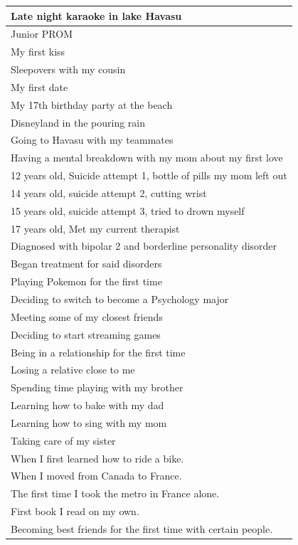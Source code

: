 \documentclass[
  .7em,
  letterpaper,
  DIV=11,
  numbers=noendperiod]{scrartcl}
\begin{document}
\begin{table}
\begin{tabular}{l}
\hline
Late night karaoke in lake Havasu\\
\hline
Junior PROM\\
\hline
My first kiss\\
\hline
Sleepovers with my cousin\\
\hline
My first date\\
\hline
My 17th birthday party at the beach\\
\hline
Disneyland in the pouring rain\\
\hline
Going to Havasu with my teammates\\
\hline
Having a mental breakdown with my mom about my first love\\
\hline
12 years old, Suicide attempt 1, bottle of pills my mom left out\\
\hline
14 years old, suicide attempt 2, cutting wrist\\
\hline
15 years old, suicide attempt 3, tried to drown myself\\
\hline
17 years old, Met my current therapist\\
\hline
Diagnosed with bipolar 2 and borderline personality disorder\\
\hline
Began treatment for said disorders\\
\hline
Playing Pokemon for the first time\\
\hline
Deciding to switch to become a Psychology major\\
\hline
Meeting some of my closest friends\\
\hline
Deciding to start streaming games\\
\hline
Being in a relationship for the first time\\
\hline
Losing a relative close to me\\
\hline
Spending time playing with my brother\\
\hline
Learning how to bake with my dad\\
\hline
Learning how to sing with my mom\\
\hline
Taking care of my sister\\
\hline
When I first learned how to ride a bike.\\
\hline
When I moved from Canada to France.\\
\hline
The first time I took the metro in France alone.\\
\hline
First book I read on my own.\\
\hline
Becoming best friends for the first time with certain people.\\

\end{tabular}
\end{table}
\end{document}
